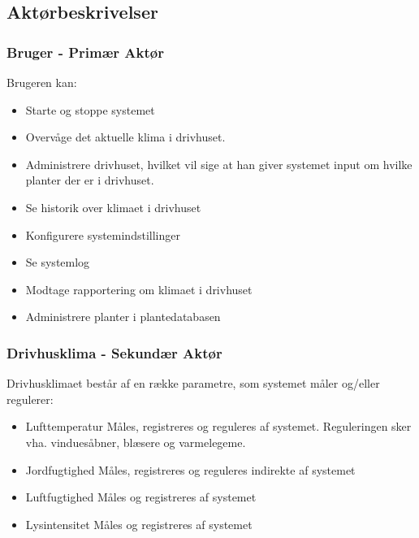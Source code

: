 \subsection{Aktørbeskrivelser}

\subsubsection{Bruger - Primær Aktør}
Brugeren kan:
\begin{itemize}
\item Starte og stoppe systemet 
\item Overvåge det aktuelle klima i drivhuset. 
\item Administrere drivhuset, hvilket vil sige at han giver systemet input om hvilke planter der er i drivhuset. 
\item Se historik over klimaet i drivhuset
\item Konfigurere systemindstillinger
\item Se systemlog
\item Modtage rapportering om klimaet i drivhuset 
\item Administrere planter i plantedatabasen
\end{itemize}

\subsubsection{Drivhusklima - Sekundær Aktør}
Drivhusklimaet består af en række parametre, som systemet måler og/eller regulerer:
\begin{itemize}
\item Lufttemperatur
	\subitem Måles, registreres og reguleres af systemet. Reguleringen sker vha. vinduesåbner, blæsere og varmelegeme.
\item Jordfugtighed
	\subitem Måles, registreres og reguleres indirekte af systemet
\item Luftfugtighed
	\subitem Måles og registreres af systemet
\item Lysintensitet
	\subitem Måles og registreres af systemet
\end{itemize}

